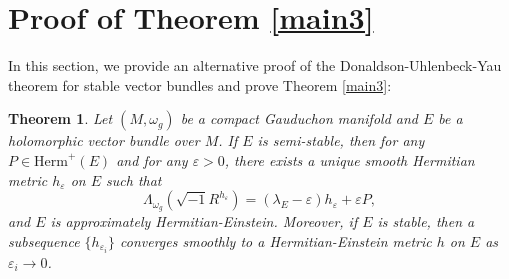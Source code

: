 \documentclass[12pt, reqno]{amsart}
\theoremstyle{plain}
\newtheorem{thm}{Theorem}[section]
\theoremstyle{definition}
\newcommand{\btheorem}{\begin{thm}}
\newcommand{\etheorem}{\end{thm}}
\newcommand{\eps}{\varepsilon}
\newcommand{\beq}{\begin{equation}}
\newcommand{\eeq}{\end{equation}}
\renewcommand{\>}{\rightarrow}
\renewcommand{\>}{\rightarrow}
\newcommand{\smo}{\sqrt{-1}}
\numberwithin{equation}{section} %
\begin{document}
\baselineskip
\section{ Proof of Theorem \ref{main3}}

In this section, we  provide an alternative proof of the Donaldson-Uhlenbeck-Yau theorem for stable vector bundles and prove Theorem \ref{main3}:

\btheorem Let $ (M,\omega_g) $ be a compact  Gauduchon manifold and
$ E $ be a  holomorphic vector bundle over $ M $. If $E$ is
semi-stable, then for any $ P \in \mathrm{Herm}^+(E) $ and for any $
\eps > 0 $, there exists a unique smooth Hermitian metric $ h_\eps $
on $E$ such that \beq \Lambda_{\omega_g}\left(\smo R^{h_\eps}\right)
= (\lambda_E - \eps)h_\eps + \eps P, \eeq and $ E $ is approximately
Hermitian-Einstein. Moreover, if $E$ is stable, then a subsequence
$\{h_{\eps_i}\}$ converges smoothly to a Hermitian-Einstein metric
$h$ on $E$ as $\eps_i\>0$. \etheorem
\end{document}
